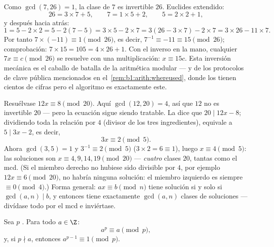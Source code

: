 \begin{example}\label{ex:b1:arith:inv7mod26}
Como $\gcd(7, 26) = 1$, la clase de $7$ es invertible  $26$.
Euclides extendido:
\[
26 = 3 \times 7 + 5, \qquad
7 = 1 \times 5 + 2, \qquad
5 = 2 \times 2 + 1 ,
\]
y después hacia atrás:
\[
1 = 5 - 2 \times 2 = 5 - 2(7 - 5) = 3 \times 5 - 2 \times 7
= 3(26 - 3 \times 7) - 2 \times 7 = 3 \times 26 - 11 \times 7 .
\]
Por tanto $7 \times (-11) \equiv 1 \pmod{26}$, es decir,
$7^{-1} \equiv -11 \equiv 15 \pmod{26}$; comprobación:
$7 \times 15 = 105 = 4 \times 26 + 1$. Con el inverso en la mano,
cualquier  $7x \equiv c \pmod{26}$ se resuelve con una
multiplicación: $x \equiv 15c$. Esta inversión mecánica es el caballo
de batalla de la aritmética modular --- y de los protocolos de clave
pública mencionados en el~\cref{rem:b1:arith:whereused}, donde los
 tienen cientos de cifras pero el algoritmo es exactamente este.
\end{example}

\begin{example}\label{ex:b1:arith:noninvertible}
Resuélvase $12x \equiv 8 \pmod{20}$. Aquí $\gcd(12, 20) = 4$, así que
$12$ no es invertible  $20$ --- pero la ecuación sigue siendo
tratable. La  dice que $20 \mid 12x - 8$; dividiendo toda
la relación por $4$ (divisor de los tres ingredientes), equivale a
$5 \mid 3x - 2$, es decir,
\[
3x \equiv 2 \pmod 5 .
\]
Ahora $\gcd(3, 5) = 1$ y $3^{-1} \equiv 2 \pmod 5$ ($3 \times 2 = 6
\equiv 1$), luego $x \equiv 4 \pmod 5$: las soluciones son
$x \equiv 4, 9, 14, 19 \pmod{20}$ --- \emph{cuatro} clases 
$20$, tantas como el mcd. (Si el miembro derecho no hubiese sido
divisible por $4$, por ejemplo $12x \equiv 6 \pmod{20}$, no habría
ninguna solución: el miembro izquierdo es siempre $\equiv 0 \pmod 4$.)
Forma general: $ax \equiv b \pmod n$ tiene solución si y solo si
$\gcd(a, n) \mid b$, y entonces tiene exactamente $\gcd(a, n)$ clases
de soluciones --- divídase todo por el mcd e inviértase.
\end{example}

\begin{theorem}\label{thm:b1:arith:fermat}
Sea $p$ . Para todo $a \in \Z$:
\[
a^p \equiv a \pmod p,
\]
y, si $p \nmid a$, entonces $a^{p-1} \equiv 1 \pmod
p$.
\end{theorem}

